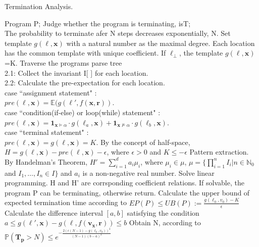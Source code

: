 \documentclass[runningheads]{llncs}
\begin{document}
\begin{algorithm}[htb]  
	\caption{Termination Analysis.}  
	\label{TA}  
	\begin{algorithmic}[1]  
		\REQUIRE 
		Program P; 
		\ENSURE  
		Judge whether the program is terminating, isT;\\
		The probability to terminate afer N steps decreases exponentially, N.
		\STATE Set template $g(\ell,\boldsymbol{x})$ with a natural number as the maximal degree. Each location has the common template with unique coefficient. If $\ell_{\bot}$, the template $g(\ell,\boldsymbol{x})$=K.
		\STATE Traverse the programs parse tree \\
		2.1: Collect the invariant I[ ] for each location.\\
		2.2: Calculate the pre-expectation for each location.\\
		\quad \quad case ``assignment statement" :\\
		\quad \quad \quad \quad $pre(\ell,\boldsymbol{x})= \mathbb{E}(g(\ell',f(\boldsymbol{x},\boldsymbol{r}))$.\\
		\quad \quad case ``condition(if-else) or loop(while) statement" :\\
		\quad \quad \quad \quad $pre(\ell,\boldsymbol{x})=\textbf{1}_{\boldsymbol{x}\vDash\alpha} \cdot g(\ell_a,\boldsymbol{x})+\textbf{1}_{\boldsymbol{x}\nvDash\alpha} \cdot g(\ell_b,\boldsymbol{x})$.\\
		\quad \quad case ``terminal statement" :\\
		\quad \quad \quad \quad $pre(\ell,\boldsymbol{x})=g(\ell,\boldsymbol{x})=K$.
		\STATE By the concept of half-space, $H=g(\ell,\boldsymbol{x})-pre(\ell,\boldsymbol{x})-\epsilon$, where $\epsilon >0$ and $K \leq -\epsilon$
		\STATE Pattern extraction. By Handelman's Theorem, $H'=\sum\limits_{i=1}^{d} a_i \mu_i$, where $\mu_i \in \mu$, $\mu=\{\prod\limits_{i=1}^{n} I_i | n\in\mathbb{N}_0$ and $ I_1,\dots,I_n \in I\}$ and $a_i$ is a non-negative real number.
		\STATE Solve linear programming. H and H' are corrsponding coefficient relations. If solvable, the program P can be terminating, otherwise return.
		\STATE Calculate the upper bound of expected termination time according to $EP(P)\leq UB(P):=\frac{g(\ell_0,v_0)-K}{\epsilon}$
		\STATE Calculate the difference interval $[a,b]$ satisfying the condition $a\leq g(\ell',\boldsymbol{x})-g(\ell,f(\boldsymbol{v_x},\boldsymbol{r}))\leq b$
		\STATE Obtain N, according to $\mathbb{P}(\bm{T_p} > N) \leq e^{-\frac{2(\epsilon(N-1)-g(\ell_0,v_0))^2}{(N-1)(b-a)^2}}$
	\end{algorithmic}  
\end{algorithm} 
\end{document}
